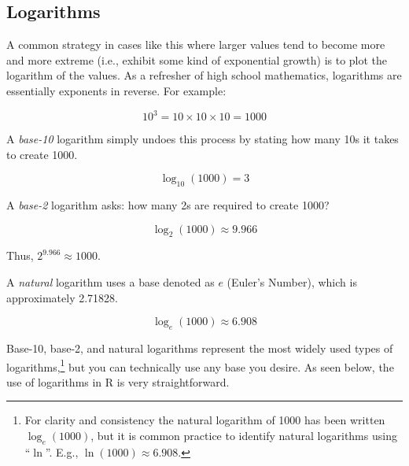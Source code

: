 \subsection{Logarithms}

A common strategy in cases like this where larger values tend to become more and more extreme (i.e., exhibit some kind of exponential growth) is to plot the logarithm of the values. As a refresher of high school mathematics, logarithms are essentially exponents in reverse. For example:

\vspace{-2em}

$$10^3 = 10 \times 10 \times 10 = 1000$$

\vspace{-1em}

\noindent
A \textit{base-10} logarithm simply undoes this process by stating how many 10s it takes to create 1000.

\vspace{-2em}

$$\log_{10}(1000) = 3$$

\vspace{-1em}

\noindent
A \textit{base-2} logarithm asks: how many 2s are required to create 1000?

\vspace{-2em}

$$\log_{2}(1000) \approx 9.966$$

\vspace{-1em}

\noindent
Thus, $2^{9.966} \approx 1000$.  


\noindent
A \textit{natural} logarithm uses a base denoted as $e$ (Euler's Number), which is approximately 2.71828.

\vspace{-2em}

$$\log_e(1000) \approx 6.908$$

\vspace{-1em}

\noindent
Base-10, base-2, and natural logarithms represent the most widely used types of logarithms,\footnote{For clarity and consistency the natural logarithm of 1000 has been written $\log_e(1000)$, but it is common practice to identify natural logarithms using ``$\ln$''. E.g., $\ln{(1000) \approx 6.908}$.} but you can technically use any base you desire.  As seen below, the use of logarithms in R is very straightforward.

